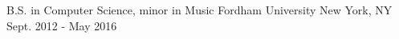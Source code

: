 \begin{cventries}
  \cventry
    {B.S. in Computer Science, minor in Music}
    {Fordham University}
    {New York, NY}
    {Sept. 2012 - May 2016}
    {}
\end{cventries}
